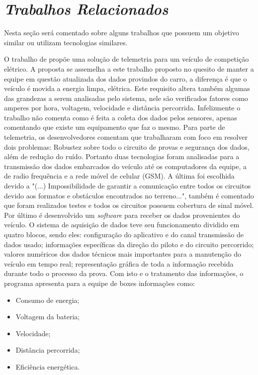 \chapter{\textit{Trabalhos Relacionados}}
	\label{ch:trabalhos}
Nesta seção será comentado sobre alguns trabalhos que possuem um objetivo similar ou utilizam tecnologias similares. 

O trabalho de  propõe uma solução de telemetria para um veículo de competição elétrico. A proposta se assemelha a este trabalho proposto no quesito de manter a equipe em questão atualizada dos dados provindos do carro, a diferença é que o veículo é movida a energia limpa, elétrica. Este requisito altera também algumas das grandezas a serem analisadas pelo sistema, nele são verificados fatores como amperes por hora, voltagem, velocidade e distância percorrida. Infelizmente o trabalho não comenta como é feita a coleta dos dados pelos sensores, apenas comentando que existe um equipamento que faz o mesmo. Para parte de telemetria, os desenvolvedores comentam que trabalharam com foco em resolver dois problemas: Robustez sobre todo o circuito de provas e segurança dos dados, além de redução do ruído. Portanto duas tecnologias foram analisadas para a transmissão dos dados embarcados do veículo até os computadores da equipe, a de radio frequência e a rede móvel de celular (GSM). A última foi escolhida devido a "(...) Impossibilidade de garantir a comunicação entre todos os circuitos devido aos formatos e obstáculos encontrados no terreno...", também é comentado que foram realizados testes e todos os circuitos possuem cobertura de sinal móvel. Por último é desenvolvido um \textit{software} para receber os dados provenientes do veículo. O sistema de aquisição de dados teve seu funcionamento dividido em quatro blocos, sendo eles: configuração do aplicativo e do canal transmissão de dados usado; informações específicas da direção do piloto e do circuito percorrido; valores numéricos dos dados técnicos mais importantes para a manutenção do veículo em tempo real; representação gráfica de toda a informação recebida durante todo o processo da prova. Com isto e o tratamento das informações, o programa apresenta para a equipe de boxes informações como:

\begin{itemize}
	\item Consumo de energia; 
	\item Voltagem da bateria;
	\item Velocidade;
	\item Distância percorrida;
	\item Eficiência energética.
\end{itemize}

